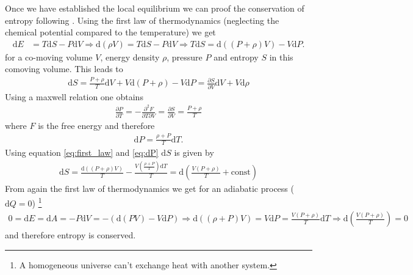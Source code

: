 \documentclass[a4paper, 12pt]{article}
\newcommand{\diff}{\mathrm{d}}
\begin{document}
Once we have established the local equilibrium
we can proof the conservation of
entropy following \cite[Sec. 3.4, from page 65]{TheEarlyUniverseKolbAndTurner}.
Using the first law of thermodynamics (neglecting the chemical potential compared to the temperature) we get
\begin{align}
    \label{eq:first_law}
    \diff E &= T \diff S - P \diff V
    \Rightarrow \diff (\rho V) = T \diff S - P \diff V
    \Rightarrow T \diff S%
    = \diff ((P + \rho) V) - V \diff P.
\end{align}
for a co-moving volume $V$, energy density $\rho$, pressure $P$ and entropy $S$ in this comoving volume.
This leads to
\begin{align*}
    \diff S = \frac{P + \rho}{T} \diff V + V \diff (P + \rho) - V \diff P
            = \frac{\partial S}{\partial V} \diff V + V \diff \rho
\end{align*}
Using a maxwell relation one obtains
\begin{align*}
    \frac{\partial P}{\partial T} = - \frac{\partial^2 F}{\partial T \partial V} = \frac{\partial S}{\partial V} = \frac{P + \rho}{T}
\end{align*}
where $F$ is the free energy and therefore
\begin{align}
    \label{eq:dP}
    \diff P = \frac{\rho + P}{T} \diff T.
\end{align}
Using equation \ref{eq:first_law} and \ref{eq:dP}  $\diff S$ is given by
\begin{align}
    \diff S = \frac{\diff((P + \rho)V)}{T} - \frac{V\left(\frac{\rho + P}{T}\right) \diff T}{T}
    = \diff \left( \frac{V(P + \rho)}{T} + \mathrm{const} \right)
\end{align}
From again the first law of thermodynamics we get for an adiabatic process ($\diff Q = 0$)
\footnote{A homogeneous universe can't exchange heat with another system.}
\begin{align*}
    0 = \diff E = \diff A = - P \diff V = - (\diff (P V) - V \diff P)
    \Rightarrow \diff ((\rho + P) V) = V \diff P = \frac{V(P + \rho)}{T} \diff T
    \Rightarrow \diff \left( \frac{V(P + \rho)}{T} \right) = 0
\end{align*}
and therefore entropy is conserved.
\end{document}
